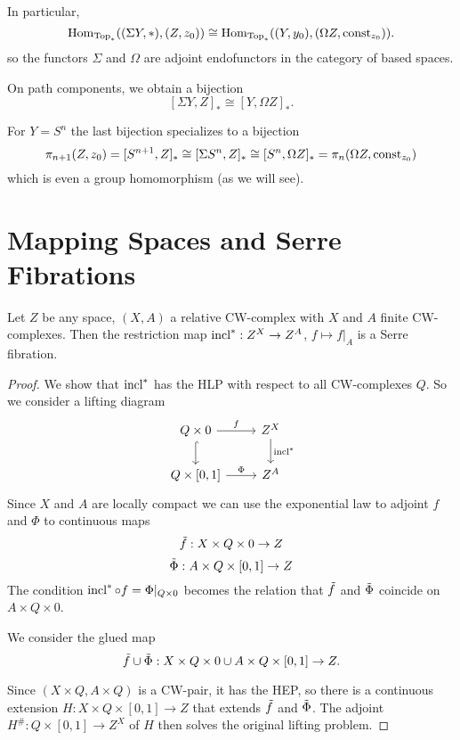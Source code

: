 In particular,
\[\operatorname{Hom}_{{\mathrm{Top}}_*}((\Sigma Y,*),(Z,z_0))\cong\operatorname{Hom}_{{\mathrm{Top}}_*}((Y,y_0),(\Omega Z,\operatorname{const}_{z_0})).\]
so the functors $\Sigma$ and $\Omega$ are adjoint endofunctors in the category of based spaces.

On path components, we obtain a bijection
\[[\Sigma Y,Z]_*\cong[Y,\Omega Z]_*.\]

For $Y=S^n$ the last bijection specializes to a bijection
\[\pi_{n+1}(Z,z_0)=[S^{n+1},Z]_*\cong[\Sigma S^n,Z]_*\cong[S^n,\Omega Z]_*=\pi_n(\Omega Z,\operatorname{const}_{z_0})\]
which is even a group homomorphism (as we will see).

\section{Mapping Spaces and Serre Fibrations}

\begin{theorem}
Let $Z$ be any space, $(X,A)$ a relative CW-complex with $X$ and $A$ finite CW-complexes. Then the restriction map $\operatorname{incl}^*:Z^X\to Z^A$, $f\mapsto f|_A$ is a Serre fibration.
\end{theorem}

\begin{proof}
We show that $\operatorname{incl}^*$ has the HLP with respect to all CW-complexes $Q$. So we consider a lifting diagram
\[\begin{tikzcd}
Q\times0 \arrow[d,hook] \arrow[r,"f"] & Z^X \arrow[d,"\incl^*"] \\
Q\times[0,1] \arrow[r,"\Phi"] & Z^A
\end{tikzcd}\]
Since $X$ and $A$ are locally compact we can use the exponential law to adjoint $f$ and $\Phi$ to continuous maps
\[\tilde f:X\times Q\times0\to Z\]
\[\tilde\Phi:A\times Q\times[0,1]\to Z\]
The condition $\operatorname{incl}^*\circ f=\Phi|_{Q\times0}$ becomes the relation that $\tilde f$ and $\tilde\Phi$ coincide on $A\times Q\times0$.

We consider the glued map
\[\tilde f\cup\tilde\Phi:X\times Q\times 0\cup A\times Q\times[0,1]\to Z.\]

Since $(X\times Q,A\times Q)$ is a CW-pair, it has the HEP, so there is a continuous extension $H:X\times Q\times[0,1]\to Z$ that extends $\tilde f$ and $\tilde\Phi$. The adjoint $H^\#:Q\times[0,1]\to Z^X$ of $H$ then solves the original lifting problem.
\end{proof}


